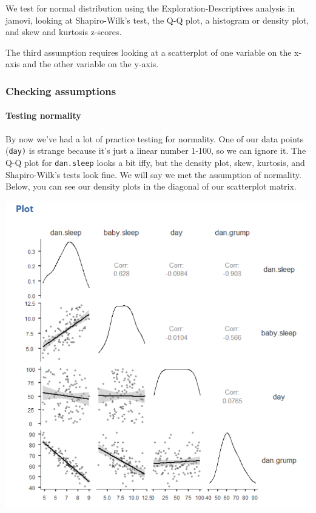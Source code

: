\documentclass[
]{book}
\begin{document}
We test for normal distribution using the Exploration-Descriptives analysis in jamovi, looking at Shapiro-Wilk's test, the Q-Q plot, a histogram or density plot, and skew and kurtosis z-scores.

The third assumption requires looking at a scatterplot of one variable on the x-axis and the other variable on the y-axis.

\hypertarget{checking-assumptions-6}{%
\subsubsection{Checking assumptions}\label{checking-assumptions-6}}

\hypertarget{testing-normality-3}{%
\paragraph{Testing normality}\label{testing-normality-3}}

By now we've had a lot of practice testing for normality. One of our data points (\texttt{day)} is strange because it's just a linear number 1-100, so we can ignore it. The Q-Q plot for \texttt{dan.sleep} looks a bit iffy, but the density plot, skew, kurtosis, and Shapiro-Wilk's tests look fine. We will say we met the assumption of normality. Below, you can see our density plots in the diagonal of our scatterplot matrix.

\includegraphics{images/08-correlation/correlation-plots.png}
\end{document}
